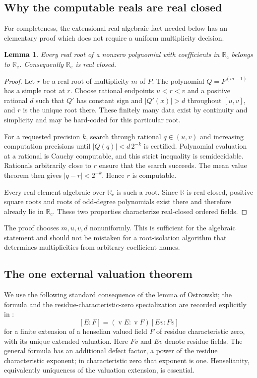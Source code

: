 \documentclass[11pt,letterpaper]{article}
\numberwithin{equation}{section}
\newtheorem{lemma}[theorem]{Lemma}
\theoremstyle{definition}
\theoremstyle{remark}
\newcommand{\Rc}{\mathbb R_{\mathrm c}}
\newcommand{\R}{\mathbb R}
\newcommand{\val}{\operatorname{v}}
\begin{document}
\subsection{Why the computable reals are real closed}

For completeness, the extensional real-algebraic fact needed below has an
elementary proof which does not require a uniform multiplicity decision.

\begin{lemma}\label{lem:Rcclosed}
Every real root of a nonzero polynomial with coefficients in $\Rc$ belongs
to $\Rc$. Consequently $\Rc$ is real closed.
\end{lemma}
\begin{proof}
Let $r$ be a real root of multiplicity $m$ of $P$. The polynomial
$Q=P^{(m-1)}$ has a simple root at $r$. Choose rational endpoints $u<r<v$
and a positive rational $d$ such that $Q'$ has constant sign and
$|Q'(x)|>d$ throughout $[u,v]$, and $r$ is the unique root there.
These finitely many data exist by continuity and simplicity and may be
hard-coded for this particular root.

For a requested precision $k$, search through rational $q\in(u,v)$ and
increasing computation precisions until
$|Q(q)|<d\,2^{-k}$ is certified. Polynomial evaluation at a rational is
Cauchy computable, and this strict inequality is semidecidable. Rationals
arbitrarily close to $r$ ensure that the search succeeds. The mean value
theorem then gives $|q-r|<2^{-k}$. Hence $r$ is computable.

Every real element algebraic over $\Rc$ is such a root. Since $\R$ is
real closed, positive square roots and roots of odd-degree polynomials
exist there and therefore already lie in $\Rc$. These two properties
characterize real-closed ordered fields.
\end{proof}

The proof chooses $m,u,v,d$ nonuniformly. This is sufficient for the
algebraic statement and should not be mistaken for a root-isolation
algorithm that determines multiplicities from arbitrary coefficient names.

\subsection{The one external valuation theorem}

We use the following standard consequence of the lemma of Ostrowski; the
formula and the residue-characteristic-zero specialization are recorded
explicitly in \cite[\S2.1, equation (1)]{rzepka}:
\begin{equation}\label{eq:ostrowski}
 [E:F]=(\val E:\val F)[Ev:Fv]
\end{equation}
for a finite extension of a henselian valued field $F$ of residue
characteristic zero, with its unique extended valuation. Here $Fv$ and
$Ev$ denote residue fields. The general formula has an additional defect
factor, a power of the residue characteristic exponent; in characteristic
zero that exponent is one. Henselianity, equivalently uniqueness of the
valuation extension, is essential.
\end{document}
